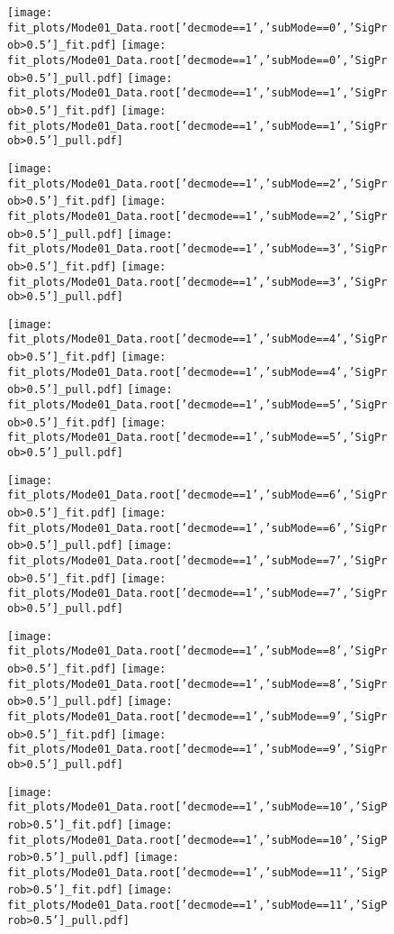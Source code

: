 \begin{figure}[p!]
\begin{center}
\texttt{[image: fit\_plots/Mode01\_Data.root['decmode==1','subMode==0','SigProb>0.5']\_fit.pdf]}
\texttt{[image: fit\_plots/Mode01\_Data.root['decmode==1','subMode==0','SigProb>0.5']\_pull.pdf]}
\texttt{[image: fit\_plots/Mode01\_Data.root['decmode==1','subMode==1','SigProb>0.5']\_fit.pdf]}
\texttt{[image: fit\_plots/Mode01\_Data.root['decmode==1','subMode==1','SigProb>0.5']\_pull.pdf]}

\texttt{[image: fit\_plots/Mode01\_Data.root['decmode==1','subMode==2','SigProb>0.5']\_fit.pdf]}
\texttt{[image: fit\_plots/Mode01\_Data.root['decmode==1','subMode==2','SigProb>0.5']\_pull.pdf]}
\texttt{[image: fit\_plots/Mode01\_Data.root['decmode==1','subMode==3','SigProb>0.5']\_fit.pdf]}
\texttt{[image: fit\_plots/Mode01\_Data.root['decmode==1','subMode==3','SigProb>0.5']\_pull.pdf]}

\texttt{[image: fit\_plots/Mode01\_Data.root['decmode==1','subMode==4','SigProb>0.5']\_fit.pdf]}
\texttt{[image: fit\_plots/Mode01\_Data.root['decmode==1','subMode==4','SigProb>0.5']\_pull.pdf]}
\texttt{[image: fit\_plots/Mode01\_Data.root['decmode==1','subMode==5','SigProb>0.5']\_fit.pdf]}
\texttt{[image: fit\_plots/Mode01\_Data.root['decmode==1','subMode==5','SigProb>0.5']\_pull.pdf]}

\texttt{[image: fit\_plots/Mode01\_Data.root['decmode==1','subMode==6','SigProb>0.5']\_fit.pdf]}
\texttt{[image: fit\_plots/Mode01\_Data.root['decmode==1','subMode==6','SigProb>0.5']\_pull.pdf]}
\texttt{[image: fit\_plots/Mode01\_Data.root['decmode==1','subMode==7','SigProb>0.5']\_fit.pdf]}
\texttt{[image: fit\_plots/Mode01\_Data.root['decmode==1','subMode==7','SigProb>0.5']\_pull.pdf]}

\texttt{[image: fit\_plots/Mode01\_Data.root['decmode==1','subMode==8','SigProb>0.5']\_fit.pdf]}
\texttt{[image: fit\_plots/Mode01\_Data.root['decmode==1','subMode==8','SigProb>0.5']\_pull.pdf]}
\texttt{[image: fit\_plots/Mode01\_Data.root['decmode==1','subMode==9','SigProb>0.5']\_fit.pdf]}
\texttt{[image: fit\_plots/Mode01\_Data.root['decmode==1','subMode==9','SigProb>0.5']\_pull.pdf]}

\texttt{[image: fit\_plots/Mode01\_Data.root['decmode==1','subMode==10','SigProb>0.5']\_fit.pdf]}
\texttt{[image: fit\_plots/Mode01\_Data.root['decmode==1','subMode==10','SigProb>0.5']\_pull.pdf]}
\texttt{[image: fit\_plots/Mode01\_Data.root['decmode==1','subMode==11','SigProb>0.5']\_fit.pdf]}
\texttt{[image: fit\_plots/Mode01\_Data.root['decmode==1','subMode==11','SigProb>0.5']\_pull.pdf]}


\end{center}
\end{figure}
